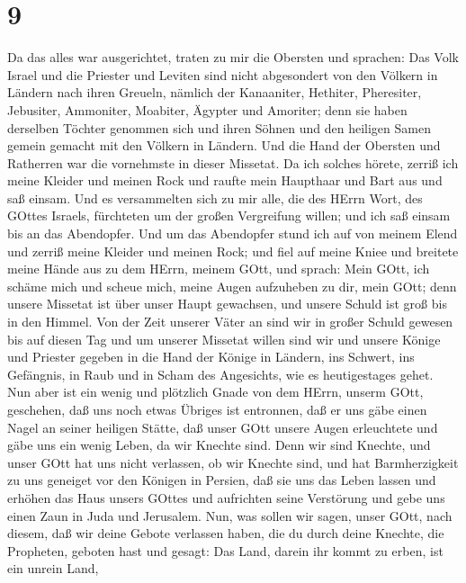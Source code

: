 \hypertarget{section-8}{%
\section{9}\label{section-8}}

 Da das alles war ausgerichtet, traten zu mir die Obersten
und sprachen: Das Volk Israel und die Priester und Leviten sind nicht
abgesondert von den Völkern in Ländern nach ihren Greueln, nämlich der
Kanaaniter, Hethiter, Pheresiter, Jebusiter, Ammoniter, Moabiter,
Ägypter und Amoriter;  denn sie haben derselben Töchter
genommen sich und ihren Söhnen und den heiligen Samen gemein gemacht mit
den Völkern in Ländern. Und die Hand der Obersten und Ratherren war die
vornehmste in dieser Missetat.  Da ich solches hörete,
zerriß ich meine Kleider und meinen Rock und raufte mein Haupthaar und
Bart aus und saß einsam.  Und es versammelten sich zu mir
alle, die des HErrn Wort, des GOttes Israels, fürchteten um der großen
Vergreifung willen; und ich saß einsam bis an das Abendopfer.
 Und um das Abendopfer stund ich auf von meinem Elend und
zerriß meine Kleider und meinen Rock; und fiel auf meine Kniee und
breitete meine Hände aus zu dem HErrn, meinem GOtt,  und
sprach: Mein GOtt, ich schäme mich und scheue mich, meine Augen
aufzuheben zu dir, mein GOtt; denn unsere Missetat ist über unser Haupt
gewachsen, und unsere Schuld ist groß bis in den Himmel. 
Von der Zeit unserer Väter an sind wir in großer Schuld gewesen bis auf
diesen Tag und um unserer Missetat willen sind wir und unsere Könige und
Priester gegeben in die Hand der Könige in Ländern, ins Schwert, ins
Gefängnis, in Raub und in Scham des Angesichts, wie es heutigestages
gehet.  Nun aber ist ein wenig und plötzlich Gnade von dem
HErrn, unserm GOtt, geschehen, daß uns noch etwas Übriges ist entronnen,
daß er uns gäbe einen Nagel an seiner heiligen Stätte, daß unser GOtt
unsere Augen erleuchtete und gäbe uns ein wenig Leben, da wir Knechte
sind.  Denn wir sind Knechte, und unser GOtt hat uns nicht
verlassen, ob wir Knechte sind, und hat Barmherzigkeit zu uns geneiget
vor den Königen in Persien, daß sie uns das Leben lassen und erhöhen das
Haus unsers GOttes und aufrichten seine Verstörung und gebe uns einen
Zaun in Juda und Jerusalem.  Nun, was sollen wir sagen,
unser GOtt, nach diesem, daß wir deine Gebote verlassen haben,
 die du durch deine Knechte, die Propheten, geboten hast
und gesagt: Das Land, darein ihr kommt zu erben, ist ein unrein Land,
